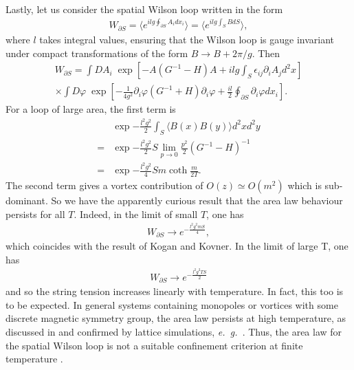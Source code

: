 \documentclass[a4paper,a4paper]{article}
\begin{document}
Lastly, let us consider the spatial Wilson loop written in the form
\begin{gather}
W_{\partial S} = \langle e^{ilg \oint_{\partial S} A_i d x_i } \rangle = 
\langle  e^{ilg \int_{S} B d S } \rangle,
\end{gather}
where $l$ takes integral values, ensuring that the Wilson loop is gauge invariant under compact transformations of the
form $B \rightarrow B + 2\pi /g$. Then
\begin{multline} 
W_{\partial S} =  
\int DA_i \; \exp{ \left[ -A (G^{-1} - H) A + ilg \int_{S} \epsilon_{ij} \partial_i A_j d^2 x \right]} \\
\times \int D \varphi \; 
\exp{ \left[ -\frac{1}{4g^2} \partial_i \varphi (G^{-1} + H) \partial_i \varphi 
+ \frac{il}{2} \oint_{\partial S} \partial_i \varphi d x_i \right]}.
\end{multline} 
For a loop of large area, the first term is
\begin{align} 
  &\exp{-\frac{l^2 g^2}{2} \int_S \langle B(x) B(y) \rangle d^2x d^2y} \nonumber \\
= &\exp{-\frac{l^2 g^2}{2} S \lim_{p \rightarrow 0} \frac{p^2}{2} (G^{-1} - H )^{-1}} \nonumber \\
= &\exp{-\frac{l^2 g^2}{4} S m \coth \frac{m}{2T}}. 
\end{align}
The second term gives a vortex contribution of $O(z) \simeq O(m^2)$ which is sub-dominant. So we have the apparently curious
result that the area law behaviour persists for all $T$. Indeed,
in the limit of small $T$, one has
\begin{gather}
W_{\partial S} \rightarrow e^{-\frac{l^2 g^2 m S}{4}},
\end{gather}
which coincides with the result of Kogan and Kovner. In the limit of large T, one has
\begin{gather}
W_{\partial S} \rightarrow e^{-\frac{l^2 g^2 T S}{2}}
\end{gather}
and so the string tension increases linearly with temperature.
In fact, this too is to be expected. In general systems containing monopoles or vortices with some
discrete magnetic symmetry group, the area law persists at high temperature, as discussed in \cite{Korthals-Altes:2000gs}
and confirmed by lattice simulations, \emph{e.\ g.\ }\cite{Karkkainen:1993ch,Karsch:1995af}.
 Thus, the area law for the spatial Wilson loop is not a suitable confinement
criterion at finite temperature .
\end{document}
